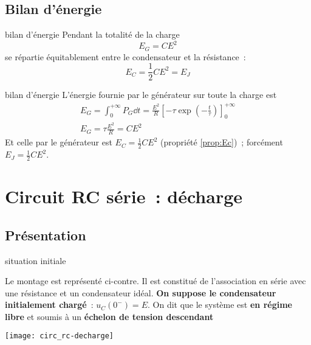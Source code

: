 \documentclass[../main/main.tex]{subfiles}
\begin{document}
\subsection{Bilan d'énergie}
\begin{tcbraster}[raster columns=2, raster equal height=rows]
    \begin{prop}[label=prop:rcenerg-charge]{bilan d'énergie}
        Pendant la totalité de la charge
        $$E_G = CE^2$$
        se répartie équitablement entre le condensateur et la résistance~:
        $$E_C = \frac{1}{2} CE^2 = E_J$$
    \end{prop}
    \begin{demo}[label=demo:rcenerg-charge]{bilan d'énergie}
        L'énergie fournie par le générateur sur toute la charge est
        \begin{gather*}
            E_G = \int_{0}^{+\infty} P_G \dd t =
            \frac{E^2}{R} \left[
                -\tau \exp \left(-\frac{t}{\tau} \right)
            \right]_0^{+\infty}\\
            E_G = \tau \frac{E^2}{R} = CE^2
        \end{gather*}
        Et celle par le générateur est $E_C = \frac{1}{2}CE^2$ (propriété
        \ref{prop:Ec})~; forcément $E_J = \frac{1}{2}CE^2$.
    \end{demo}
\end{tcbraster}

\section{Circuit RC série~: décharge}
\subsection{Présentation}
\begin{defi}[label=def:echelonC, sidebyside, righthand width=.3\linewidth]
    {situation initiale}

    Le montage est représenté ci-contre. Il est constitué de l'association en
    série avec une résistance et un condensateur idéal. \textbf{On suppose le
    condensateur initialement chargé}~: $u_C(0^-) = E$. On dit que le système
    est \textbf{en régime libre} et soumis à un \textbf{échelon de tension
    descendant}

    \tcblower
    \begin{center}
        \texttt{[image: circ\_rc-decharge]}
    \end{center}
\end{defi}
\end{document}
